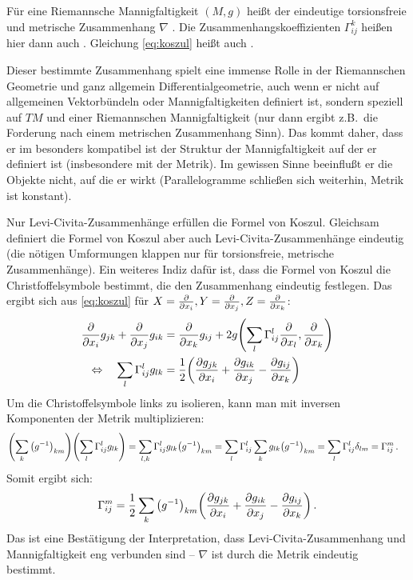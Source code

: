 \begin{defi}
Für eine Riemannsche Mannigfaltigkeit $(M, g)$ heißt der eindeutige torsionsfreie und metrische Zusammenhang $\nabla$ . Die Zusammenhangskoeffizienten $\Gamma_{ij}^k$ heißen hier dann auch . Gleichung \eqref{eq:koszul} heißt auch .
\end{defi}
Dieser bestimmte Zusammenhang spielt eine immense Rolle in der Riemannschen Geometrie und ganz allgemein Differentialgeometrie, auch wenn er nicht auf allgemeinen Vektorbündeln oder Mannigfaltigkeiten definiert ist, sondern speziell auf $TM$ und einer Riemannschen Mannigfaltigkeit (nur dann ergibt z.B.~die Forderung nach einem metrischen Zusammenhang Sinn). Das kommt daher, dass er im besonders kompatibel ist der Struktur der Mannigfaltigkeit auf der er definiert ist (insbesondere mit der Metrik). Im gewissen Sinne beeinflußt er die Objekte nicht, auf die er wirkt (Parallelogramme schließen sich weiterhin, Metrik ist konstant).

Nur Levi-Civita-Zusammenhänge erfüllen die Formel von Koszul. Gleichsam definiert die Formel von Koszul aber auch Levi-Civita-Zusammenhänge eindeutig (die nötigen Umformungen klappen nur für torsionsfreie, metrische Zusammenhänge). Ein weiteres Indiz dafür ist, dass die Formel von Koszul die Christfoffelsymbole bestimmt, die den Zusammenhang eindeutig festlegen. Das ergibt sich aus \eqref{eq:koszul} für $X = \pdv{x_i}, Y = \pdv{x_j}, Z = \pdv{x_k}$:
\begin{align*}
\pdv{x_i} g_{jk} + \pdv{x_j} g_{ik} &= \pdv{x_k} g_{ij} + 2 g\qty(\sum_l \Gamma_{ij}^l \pdv{x_l}, \pdv{x_k})%
\\
\Leftrightarrow \quad \sum_l \Gamma_{ij}^l g_{lk} &= \frac{1}{2} \qty(\pdv{g_{jk}}{x_i} + \pdv{g_{ik}}{x_j} - \pdv{g_{ij}}{x_k})
\end{align*}
Um die Christoffelsymbole links zu isolieren, kann man mit inversen Komponenten der Metrik multiplizieren:
\begin{align*}
\qty(\sum_k \qty(g^{-1})_{km}) \qty(\sum_l \Gamma_{ij}^l g_{lk}) = \sum_{l, k} \Gamma_{ij}^l g_{lk} \qty(g^{-1})_{km} &= \sum_l \Gamma_{ij}^l \sum_k g_{lk} \qty(g^{-1})_{km} = \sum_l \Gamma_{ij}^l \delta_{lm} = \Gamma_{ij}^m \, .
\end{align*}
Somit ergibt sich:
\begin{equation}
\Gamma_{ij}^m = \frac{1}{2} \sum_k \qty(g^{-1})_{km} \qty(\pdv{g_{jk}}{x_i} + \pdv{g_{ik}}{x_j} - \pdv{g_{ij}}{x_k}) \, .
\end{equation}
Das ist eine Bestätigung der Interpretation, dass Levi-Civita-Zusammenhang und Mannigfaltigkeit eng verbunden sind -- $\nabla$ ist durch die Metrik eindeutig bestimmt.



